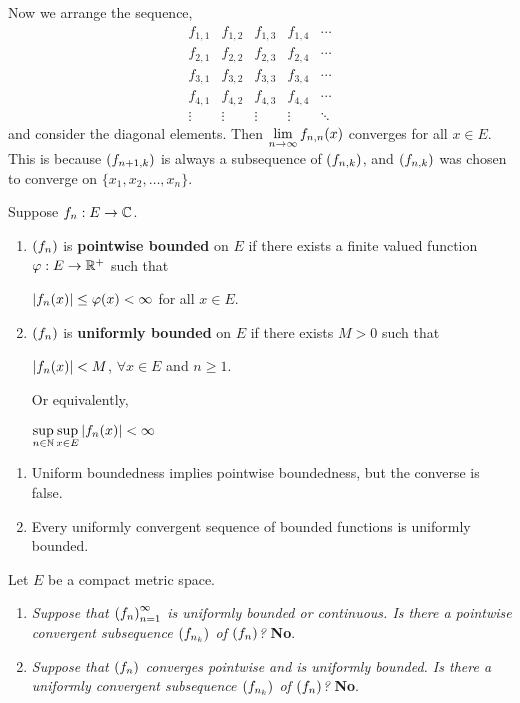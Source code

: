 Now we arrange the sequence,
\[
    \begin{matrix}
        f_{1, 1} & f_{1, 2} & f_{1, 3} & f_{1, 4} & \cdots \\
        f_{2, 1} & f_{2, 2} & f_{2, 3} & f_{2, 4} & \cdots \\
        f_{3, 1} & f_{3, 2} & f_{3, 3} & f_{3, 4} & \cdots \\
        f_{4, 1} & f_{4, 2} & f_{4, 3} & f_{4, 4} & \cdots \\
        \vdots   & \vdots   & \vdots   & \vdots   & \ddots
    \end{matrix}
\]
and consider the diagonal elements. Then \(\displaystyle \lim_{n \rightarrow \infty} f_{n, n}(x)\) converges for all \(x \in E\). This is because \(\left( f_{n+1, k} \right)\) is always a subsequence of \(\left( f_{n, k} \right)\), and \(\left( f_{n, k} \right)\) was chosen to converge on \(\{x_1, x_2, \dots, x_n\}\).

 Suppose \(f_n: E \rightarrow \mathbb{C}\).
\begin{enumerate}
    \item {} \(\left( f_n \right)\) is \textbf{pointwise bounded} on \(E\) if there exists a finite valued function \(\varphi: E \rightarrow \mathbb{R}^+\) such that
          \begin{center}
              \(\left| f_n(x) \right| \leq \varphi(x) < \infty\) for all \(x\in E\).
          \end{center}
    \item {} \(\left( f_n \right)\) is \textbf{uniformly bounded} on \(E\) if there exists \(M > 0\) such that
          \begin{center}
              \(\left| f_n(x) \right| < M\), \(\forall x \in E\) and \(n \geq 1\).
          \end{center}
          Or equivalently,
          \begin{center}
              \(\displaystyle \sup_{n\in \mathbb{N}} \sup_{x \in E} \left| f_n(x) \right| < \infty\)
          \end{center}
\end{enumerate}

\rmk
\begin{enumerate}
    \item Uniform boundedness implies pointwise boundedness, but the converse is false.
    \item Every uniformly convergent sequence of bounded functions is uniformly bounded.
\end{enumerate}

\medskip

\question Let \(E\) be a compact metric space.
\begin{enumerate}
    \item \textit{Suppose that \(\left( f_n \right)_{n=1}^\infty\) is uniformly bounded or continuous. Is there a pointwise convergent subsequence \(\left( f_{n_k} \right)\) of \(\left( f_n \right)\)?} \textbf{No}.
    \item \textit{Suppose that \(\left( f_n \right)\) converges pointwise and is uniformly bounded. Is there a uniformly convergent subsequence \(\left( f_{n_k} \right)\) of \(\left( f_n \right)\)?} \textbf{No}.
\end{enumerate}

